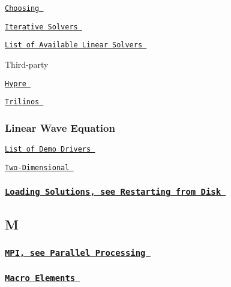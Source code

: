 \begin{DoxyItemize}
\item  \href{ ../../poisson/two_d_poisson/html/index.html#different_solvers }{\tt Choosing }  
\item  \href{ ../../linear_solvers/html/index.html#iterative_linear_solvers }{\tt Iterative Solvers }  
\item  \href{ ../../linear_solvers/html/index.html#available_solvers }{\tt List of Available Linear Solvers }  
\item  Third-\/party   
\begin{DoxyItemize}
\item  \href{ ../../linear_solvers/html/index.html#hypre }{\tt Hypre }  
\item  \href{ ../../linear_solvers/html/index.html#trilinos }{\tt Trilinos }  
\end{DoxyItemize} 
\end{DoxyItemize}\subsubsection*{ Linear Wave Equation }

 
\begin{DoxyItemize}
\item  \href{ ../../example_code_list/html/index.html#wave }{\tt List of Demo Drivers }  
\item  \href{ ../../linear_wave/two_d_linear_wave/html/index.html }{\tt Two-\/\-Dimensional }  
\end{DoxyItemize} \subsubsection*{ \href{ ../../index/html/index.html#R.RestartingfromDisk }{\tt Loading Solutions, see Restarting from Disk } }

 \subsection*{ M }

 \subsubsection*{ \href{ ../../index/html/index.html#P.ParallelProcessing }{\tt M\-P\-I, see Parallel Processing } }

\subsubsection*{ \href{ ../../the_data_structure/html/index.html#MacroElements }{\tt Macro Elements } }

